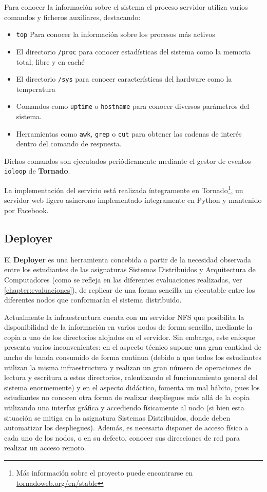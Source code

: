 Para conocer la información sobre el sistema el proceso servidor utiliza varios comandos y ficheros auxiliares, destacando:
\begin{itemize}
\item \texttt{top} Para conocer la información sobre los procesos más activos
\item El directorio \texttt{/proc} para conocer estadísticas del sistema como la memoria total, libre y en caché
\item El directorio \texttt{/sys} para conocer características del hardware como la temperatura
\item Comandos como \texttt{uptime} o \texttt{hostname} para conocer diversos parámetros del sistema.
\item Herramientas como \texttt{awk}, \texttt{grep} o \texttt{cut} para obtener las cadenas de interés dentro del comando de respuesta.
\end{itemize}

Dichos comandos son ejecutados periódicamente mediante el gestor de eventos \texttt{ioloop} de \textbf{Tornado}.

La implementación del servicio está realizada íntegramente en Tornado\footnote{Más información sobre el proyecto puede encontrarse en \href{http://www.tornadoweb.org/en/stable/}{tornadoweb.org/en/stable}}, un servidor web ligero asíncrono implementado íntegramente en Python y mantenido por Facebook.

\subsection{Deployer}

El \textbf{Deployer} es una herramienta concebida a partir de la necesidad observada entre los estudiantes de las asignaturas Sistemas Distribuidos y Arquitectura de Computadores (como se refleja en las diferentes evaluaciones realizadas, ver \ref{chapter:evaluaciones}), de replicar de una forma sencilla un ejecutable entre los diferentes nodos que conformarán el sistema distribuido.

Actualmente la infraestructura cuenta con un servidor NFS que posibilita la disponibilidad de la información en varios nodos de forma sencilla, mediante la copia a uno de los directorios alojados en el servidor. Sin embargo, este enfoque presenta varios inconvenientes: en el aspecto técnico supone una gran cantidad de ancho de banda consumido de forma continua (debido a que todos los estudiantes utilizan la misma infraestructura y realizan un gran número de operaciones de lectura y escritura a estos directorios, ralentizando el funcionamiento general del sistema enormemente) y en el aspecto didáctico, fomenta un mal hábito, pues los estudiantes no conocen otra forma de realizar despliegues más allá de la copia utilizando una interfaz gráfica y accediendo físicamente al nodo (si bien esta situación se mitiga en la asignatura Sistemas Distribuidos, donde deben automatizar los despliegues). Además, es necesario disponer de acceso físico a cada uno de los nodos, o en su defecto, conocer sus direcciones de red para realizar un acceso remoto.

